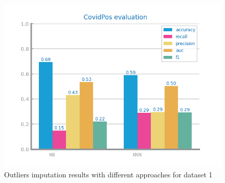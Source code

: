 \documentclass[10pt]{extarticle}
\begin{document}
\begin{figure}[H]
\includegraphics[scale=0.80]{images/dataset1/data_preparation/CovidPos_outliers_treat_truncating_minmax.png}
\caption{Outliers imputation results with different approaches for dataset 1}
\end{figure}
\end{document}
